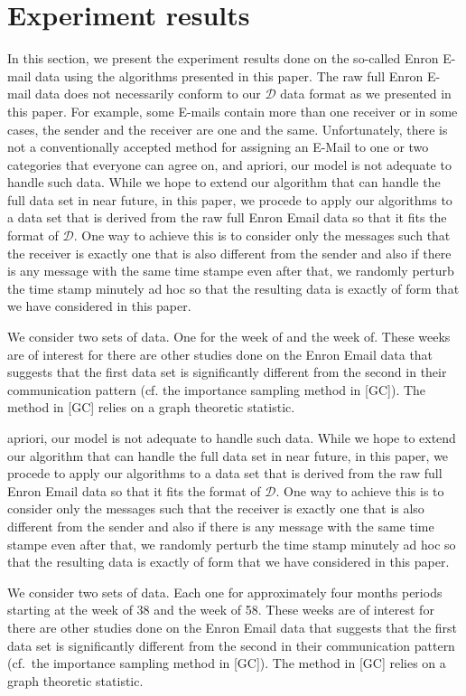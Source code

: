 \documentclass[12pt]{article}%
\begin{document}
\section{Experiment results}
In this section, we present the experiment results done on the so-called Enron E-mail data using the algorithms 
presented in this paper.  The raw full Enron E-mail data does not necessarily conform to our $\mathcal D$ data 
format as we presented in this paper.  For example, some E-mails contain more than one receiver or in some cases, 
the sender and the receiver are one and the same.  Unfortunately, there is not a conventionally accepted method for 
assigning an E-Mail to one or two categories that everyone can agree on, and apriori, our model is not adequate to
handle such data.  While we hope to extend our algorithm that can handle the full data set in near future, in this
paper, we procede to apply our algorithms to a data set that is derived from the raw full Enron Email data so that 
it fits the format of $\mathcal D$.  One way to achieve this is to consider only the messages such that 
the receiver is exactly one that is also different from the sender and also if there is any message with 
the same time stampe even after that, we randomly perturb the time stamp minutely ad hoc so that the resulting data 
is exactly of form that we have considered in this paper. 

We consider two sets of data.  One for the week of and the week of.  These weeks are of interest for there are other 
studies done on the Enron Email data that suggests that the first data set is significantly different from the second
in their communication pattern (cf. the importance sampling method in [GC]).  The method in [GC] relies on a graph theoretic statistic.

apriori, our model is not adequate to
handle such data.  While we hope to extend our algorithm that can handle the full data set in near future, in this
paper, we procede to apply our algorithms to a data set that is derived from the raw full Enron Email data so that 
it fits the format of $\mathcal D$.  One way to achieve this is to consider only the messages such that 
the receiver is exactly one that is also different from the sender and also if there is any message with 
the same time stampe even after that, we randomly perturb the time stamp minutely ad hoc so that the resulting data 
is exactly of form that we have considered in this paper. 

We consider two sets of data.  Each one for approximately four months periods starting at the week of 38 and the week of 58.  These weeks are of interest for there are other studies done on the Enron Email data that suggests that the first data set is significantly different from the second
in their communication pattern (cf.\ the importance sampling method in [GC]).  The method in [GC] relies on a graph theoretic statistic.
\end{document}
